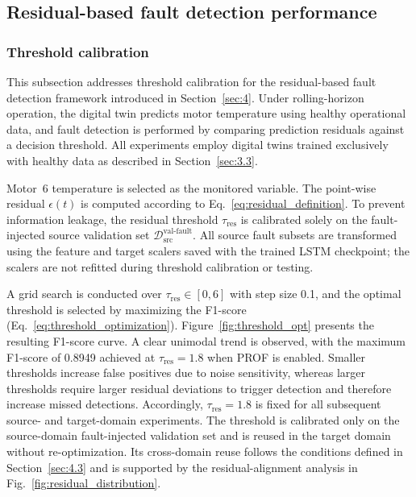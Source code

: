 \documentclass[a4paper,10pt]{cas-sc}%
\newcommand{\rev}[1]{#1}
\newcommand{\roundtworev}[1]{\textcolor{roundtwored}{#1}}
\begin{document}
\subsection{Residual-based fault detection performance}\label{sec:6.2}

\subsubsection{Threshold calibration}\label{sec:6.2.1}

This subsection addresses threshold calibration for the residual-based fault detection framework introduced in Section~\ref{sec:4}. Under rolling-horizon operation, the digital twin predicts motor temperature using healthy operational data, and fault detection is performed by comparing prediction residuals against a decision threshold. All experiments employ digital twins trained exclusively with healthy data as described in Section~\ref{sec:3.3}.

Motor~6 temperature is selected as the monitored variable. The point-wise residual $\epsilon(t)$ is computed according to Eq.~\eqref{eq:residual_definition}. To prevent information leakage, the residual threshold $\tau_{\mathrm{res}}$ is calibrated solely on the fault-injected source validation set $\mathcal{D}_{\text{src}}^{\text{val-fault}}$. \rev{All source fault subsets are transformed using the feature and target scalers saved with the trained LSTM checkpoint; the scalers are not refitted during threshold calibration or testing.}

\rev{A grid search is conducted over $\tau_{\mathrm{res}}\in[0,6]$ with step size 0.1, and the optimal threshold is selected by maximizing the F1-score (Eq.~\eqref{eq:threshold_optimization}). Figure~\ref{fig:threshold_opt} presents the resulting F1-score curve. A clear unimodal trend is observed, with the maximum F1-score of 0.8949 achieved at $\tau_{\mathrm{res}}=1.8$ when PROF is enabled.} \roundtworev{Smaller thresholds increase false positives due to noise sensitivity, whereas larger thresholds require larger residual deviations to trigger detection and therefore increase missed detections.} \roundtworev{Accordingly, $\tau_{\mathrm{res}}=1.8$ is fixed for all subsequent source- and target-domain experiments. The threshold is calibrated only on the source-domain fault-injected validation set and is reused in the target domain without re-optimization. Its cross-domain reuse follows the conditions defined in Section~\ref{sec:4.3} and is supported by the residual-alignment analysis in Fig.~\ref{fig:residual_distribution}.}
\end{document}
